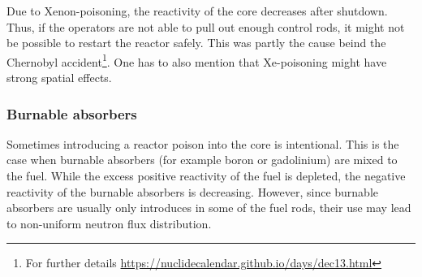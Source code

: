 Due to Xenon-poisoning, the reactivity of the core decreases after shutdown. Thus, if the operators are not able to pull out enough control rods, it might not be possible to restart the reactor safely. This was partly the cause beind the Chernobyl accident\footnote{For further details \url{https://nuclidecalendar.github.io/days/dec13.html}}. One has to also mention that Xe-poisoning might have strong spatial effects. 

\subsubsection{Burnable absorbers}

Sometimes introducing a reactor poison into the core is intentional. This is the case when burnable absorbers (for example boron or gadolinium) are mixed to the fuel. While the excess positive reactivity of the fuel is depleted, the negative reactivity of the burnable absorbers is decreasing. However, since burnable absorbers are usually only introduces in some of the fuel rods, their use may lead to non-uniform neutron flux distribution.

%
